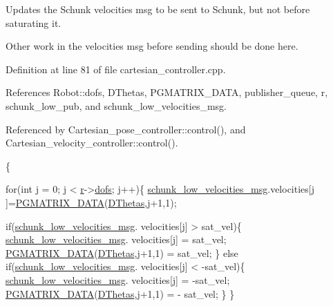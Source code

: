 Updates the Schunk velocities msg to be sent to Schunk, but not before saturating it. 

Other work in the velocities msg before sending should be done here. 

Definition at line 81 of file cartesian\-\_\-controller.\-cpp.



References Robot\-::dofs, D\-Thetas, P\-G\-M\-A\-T\-R\-I\-X\-\_\-\-D\-A\-T\-A, publisher\-\_\-queue, r, schunk\-\_\-low\-\_\-pub, and schunk\-\_\-low\-\_\-velocities\-\_\-msg.



Referenced by Cartesian\-\_\-pose\-\_\-controller\-::control(), and Cartesian\-\_\-velocity\-\_\-controller\-::control().


\begin{DoxyCode}
                                                                   \{

        \textcolor{keywordflow}{for}(\textcolor{keywordtype}{int} j = 0; j < \hyperlink{classCartesian__controller_a5562129951bd802e4ded77fc716c87a0}{r}->\hyperlink{structRobot_a51d4a86ac5314a1ed8614d5664c80747}{dofs}; j++)\{
                \hyperlink{classCartesian__controller_af59178c57bdd73d9eb474577247bbe40}{schunk\_low\_velocities\_msg}.velocities[j
      ]=\hyperlink{gmatrix_8h_a7333180c47234295df2bd7b09ac00da8}{PGMATRIX\_DATA}(\hyperlink{classCartesian__controller_a5d6419e62e130150edfcbd82b1dadcae}{DThetas},j+1,1);

                \textcolor{keywordflow}{if}(\hyperlink{classCartesian__controller_af59178c57bdd73d9eb474577247bbe40}{schunk\_low\_velocities\_msg}.
      velocities[j] > sat\_vel)\{
                        \hyperlink{classCartesian__controller_af59178c57bdd73d9eb474577247bbe40}{schunk\_low\_velocities\_msg}.
      velocities[j] = sat\_vel;
                        \hyperlink{gmatrix_8h_a7333180c47234295df2bd7b09ac00da8}{PGMATRIX\_DATA}(\hyperlink{classCartesian__controller_a5d6419e62e130150edfcbd82b1dadcae}{DThetas},j+1,1) = 
      sat\_vel;
                \}
                \textcolor{keywordflow}{else} \textcolor{keywordflow}{if}(\hyperlink{classCartesian__controller_af59178c57bdd73d9eb474577247bbe40}{schunk\_low\_velocities\_msg}.
      velocities[j] < -sat\_vel)\{
                        \hyperlink{classCartesian__controller_af59178c57bdd73d9eb474577247bbe40}{schunk\_low\_velocities\_msg}.
      velocities[j] = -sat\_vel;
                        \hyperlink{gmatrix_8h_a7333180c47234295df2bd7b09ac00da8}{PGMATRIX\_DATA}(\hyperlink{classCartesian__controller_a5d6419e62e130150edfcbd82b1dadcae}{DThetas},j+1,1) = -
      sat\_vel;
                \}
        \}


\end{DoxyCode}
